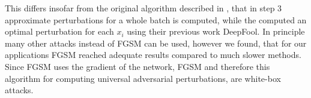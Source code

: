 This differs insofar from the original algorithm described in \cite{unversal}, that in step 3 approximate perturbations for a whole batch is computed, while the computed an optimal perturbation for each $x_i$ using their previous work DeepFool.  In principle many other attacks instead of FGSM can be used, however we found, that for our applications FGSM reached adequate results compared to much slower methods. Since FGSM uses the gradient of the network, FGSM and therefore this algorithm for computing universal adversarial perturbations, are white-box attacks.
